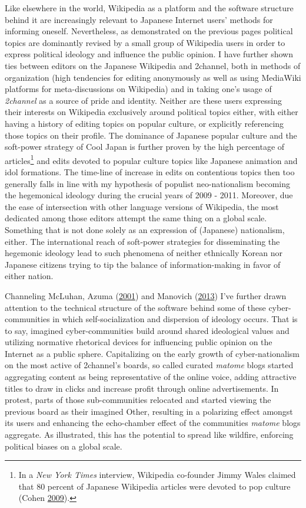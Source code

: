 \documentclass[10pt,british,A4paper,,openany]{memoir}
\begin{document}
Like elsewhere in the world, Wikipedia as a platform and the software
structure behind it are increasingly relevant to Japanese Internet
users' methods for informing oneself. Nevertheless, as demonstrated on
the previous pages political topics are dominantly revised by a small
group of Wikipedia users in order to express political ideology and
influence the public opinion. I have further shown ties between editors
on the Japanese Wikipedia and 2channel, both in methods of organization
(high tendencies for editing anonymously as well as using MediaWiki
platforms for meta-discussions on Wikipedia) and in taking one's usage
of \emph{2channel} as a source of pride and identity. Neither are these
users expressing their interests on Wikipedia exclusively around
political topics either, with either having a history of editing topics
on popular culture, or explicitly referencing those topics on their
profile. The dominance of Japanese popular culture and the soft-power
strategy of Cool Japan is further proven by the high percentage of
articles\footnote{In a \emph{New York Times} interview, Wikipedia
  co-founder Jimmy Wales claimed that 80 percent of Japanese Wikipedia
  articles were devoted to pop culture (Cohen
  \protect\hyperlink{ref-cohen_wikipedia_2009}{2009}).} and edits
devoted to popular culture topics like Japanese animation and idol
formations. The time-line of increase in edits on contentious topics
then too generally falls in line with my hypothesis of populist
neo-nationalism becoming the hegemonical ideology during the crucial
years of 2009 - 2011. Moreover, due the ease of intersection with other
language versions of Wikipedia, the most dedicated among those editors
attempt the same thing on a global scale. Something that is not done
solely as an expression of (Japanese) nationalism, either. The
international reach of soft-power strategies for disseminating the
hegemonic ideology lead to such phenomena of neither ethnically Korean
nor Japanese citizens trying to tip the balance of information-making in
favor of either nation.

Channeling McLuhan, Azuma
(\protect\hyperlink{ref-azuma_otaku:_2001}{2001}) and Manovich
(\protect\hyperlink{ref-manovich_software_2013}{2013}) I've further
drawn attention to the technical structure of the software behind some
of these cyber-communities in which self-socialization and dispersion of
ideology occurs. That is to say, imagined cyber-communities build around
shared ideological values and utilizing normative rhetorical devices for
influencing public opinion on the Internet as a public sphere.
Capitalizing on the early growth of cyber-nationalism on the most active
of 2channel's boards, so called curated \emph{matome} blogs started
aggregating content as being representative of the online voice, adding
attractive titles to draw in clicks and increase profit through online
advertisements. In protest, parts of those sub-communities relocated and
started viewing the previous board as their imagined Other, resulting in
a polarizing effect amongst its users and enhancing the echo-chamber
effect of the communities \emph{matome} blogs aggregate. As illustrated,
this has the potential to spread like wildfire, enforcing political
biases on a global scale.
\end{document}
